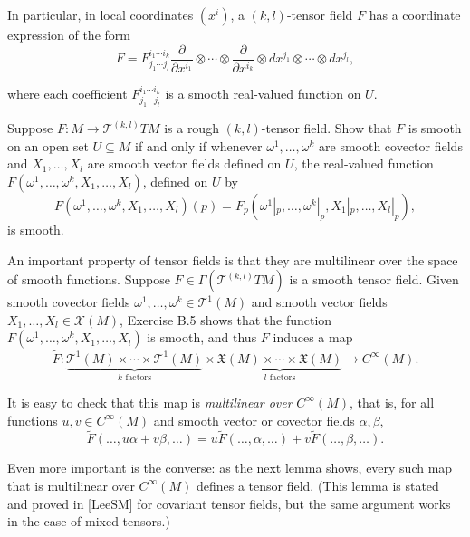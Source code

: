 In particular, in local coordinates $(x^i)$, a $(k,l)$-tensor field $F$ has a coordinate expression of the form
\begin{equation}
F = F^{i_1 \cdots i_k}_{j_1 \cdots j_l} \frac{\partial}{\partial x^{i_1}} \otimes \cdots \otimes \frac{\partial}{\partial x^{i_k}} \otimes dx^{j_1} \otimes \cdots \otimes dx^{j_l}, \tag{B.8}
\end{equation}

where each coefficient $F^{i_1 \cdots i_k}_{j_1 \cdots j_l}$ is a smooth real-valued function on $U$.

\begin{exercise}\label{exer:smooth-tensor-field-criterion}
Suppose $F: M \to \mathcal{T}^{(k,l)} T M$ is a rough $(k,l)$-tensor field. Show that $F$ is smooth on an open set $U \subseteq M$ if and only if whenever $\omega^1, \ldots, \omega^k$ are smooth covector fields and $X_1, \ldots, X_l$ are smooth vector fields defined on $U$, the real-valued function $F(\omega^1, \ldots, \omega^k, X_1, \ldots, X_l)$, defined on $U$ by
\[F(\omega^1, \ldots, \omega^k, X_1, \ldots, X_l)(p) = F_p(\omega^1|_p, \ldots, \omega^k|_p, X_1|_p, \ldots, X_l|_p),\]
is smooth.
\end{exercise}

An important property of tensor fields is that they are multilinear over the space of smooth functions. Suppose $F \in \Gamma(\mathcal{T}^{(k,l)} T M)$ is a smooth tensor field. Given smooth covector fields $\omega^1, \ldots, \omega^k \in \mathcal{T}^1(M)$ and smooth vector fields $X_1, \ldots, X_l \in \mathcal{X}(M)$, Exercise B.5 shows that the function $F(\omega^1, \ldots, \omega^k, X_1, \ldots, X_l)$ is smooth, and thus $F$ induces a map
\[
\tilde{F}: \underbrace{\mathcal{T}^1(M) \times \cdots \times \mathcal{T}^1(M)}_{k \text{ factors}} \times \underbrace{\mathfrak{X}(M) \times \cdots \times \mathfrak{X}(M)}_{l \text{ factors}} \to C^\infty(M).
\]

It is easy to check that this map is \emph{multilinear over} $C^\infty(M)$, that is, for all functions $u, v \in C^\infty(M)$ and smooth vector or covector fields $\alpha, \beta$,
\[
\tilde{F}(\ldots, u\alpha + v\beta, \ldots) = u\tilde{F}(\ldots, \alpha, \ldots) + v\tilde{F}(\ldots, \beta, \ldots).
\]

Even more important is the converse: as the next lemma shows, every such map that is multilinear over $C^\infty(M)$ defines a tensor field. (This lemma is stated and proved in [LeeSM] for covariant tensor fields, but the same argument works in the case of mixed tensors.)

